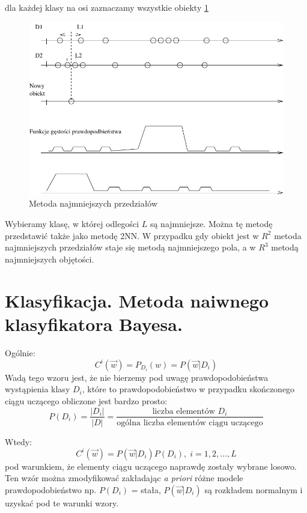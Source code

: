 \documentclass[a4paper,10pt]{article}
\begin{document}
dla każdej klasy na osi zaznaczamy wszystkie obiekty \ref{fig:min_dist}
\begin{figure}[ht]
  \centering
  \includegraphics[width=\textwidth]{min_przed.pdf}
  \caption{Metoda najmniejszych przedziałów}
  \label{fig:min_dist}
\end{figure}

Wybieramy klasę, w której odlegości $L$ są najmniejsze. Można tę metodę przedstawić także jako metodę 2NN.
W przypadku gdy obiekt jest w $R^2$ metoda najmniejszych przedziałów staje się metodą najmniejszego pola, a w $R^3$ metodą najmniejszych objętości.

\section{Klasyfikacja. Metoda naiwnego klasyfikatora Bayesa.}
Ogólnie:
\begin{equation}
C^i(\overrightarrow{w})=P_{D_i}(w)=P(\overrightarrow{w}|D_i)
\end{equation}
Wadą tego wzoru jest, że nie bierzemy pod uwagę prawdopodobieństwa wystąpienia klasy $D_i$, które to prawdopodobieństwo w przypadku skończonego ciągu uczącego obliczone jest bardzo prosto:
\begin{equation}
P(D_i)=\frac{|D_i|}{|D|}=\frac{\mbox{liczba elementów $D_i$}}{\mbox{ogólna liczba elementów ciągu uczącego}}
\end{equation}

Wtedy:
\begin{equation}
C^i(\overrightarrow{w})=P(\overrightarrow{w}|D_i)P(D_i),\; i=1,2,\ldots,L
\end{equation}
pod warunkiem, że elementy ciągu uczącego naprawdę zostały wybrane losowo.
Ten wzór można zmodyfikować zakładając \textit{a priori} różne modele prawdopodobieństwo np. $P(D_i)$ = stała, $P(\overrightarrow{w}|D_i)$ są rozkładem normalnym
i uzyskać pod te warunki wzory.
\end{document}
